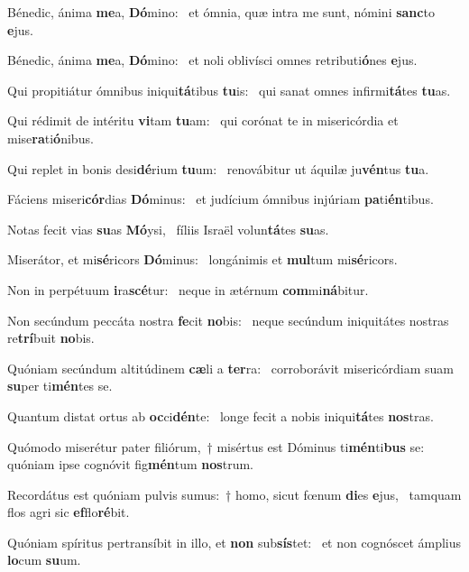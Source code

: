 \item Bénedic, ánima \textbf{me}a, \textbf{Dó}mino:~\psstar{} et ómnia, quæ intra me sunt, nómini \textbf{sanc}to \textbf{e}jus.
\item Bénedic, ánima \textbf{me}a, \textbf{Dó}mino:~\psstar{} et noli oblivísci omnes retributi\textbf{ó}nes \textbf{e}jus.
\item Qui propitiátur ómnibus iniqui\textbf{tá}tibus \textbf{tu}is:~\psstar{} qui sanat omnes infirmi\textbf{tá}tes \textbf{tu}as.
\item Qui rédimit de intéritu \textbf{vi}tam \textbf{tu}am:~\psstar{} qui corónat te in misericórdia et mise\textbf{ra}ti\textbf{ó}nibus.
\item Qui replet in bonis desi\textbf{dé}rium \textbf{tu}um:~\psstar{} renovábitur ut áquilæ ju\textbf{vén}tus \textbf{tu}a.
\item Fáciens miseri\textbf{cór}dias \textbf{Dó}minus:~\psstar{} et judícium ómnibus injúriam \textbf{pa}ti\textbf{én}tibus.
\item Notas fecit vias \textbf{su}as \textbf{Mó}ysi,~\psstar{} fíliis Israël volun\textbf{tá}tes \textbf{su}as.
\item Miserátor, et mi\textbf{sé}ricors \textbf{Dó}minus:~\psstar{} longánimis et \textbf{mul}tum mi\textbf{sé}ricors.
\item Non in perpétuum \textbf{i}ra\textbf{scé}tur:~\psstar{} neque in ætérnum \textbf{com}mi\textbf{ná}bi\-tur.
\item Non secúndum peccáta nostra \textbf{fe}cit \textbf{no}bis:~\psstar{} neque secúndum iniquitátes nostras re\textbf{trí}buit \textbf{no}bis.
\item Quóniam secúndum altitúdinem \textbf{cæ}li a \textbf{ter}ra:~\psstar{} corroborávit misericórdiam suam \textbf{su}per ti\textbf{mén}tes se.
\item Quantum distat ortus ab \textbf{oc}ci\textbf{dén}te:~\psstar{} longe fecit a nobis iniqui\textbf{tá}tes \textbf{nos}tras.
\item Quómodo miserétur pater filiórum,~† misértus est Dóminus ti\textbf{mén}ti\textbf{bus} se:~\psstar{} quóniam ipse cognóvit fig\textbf{mén}tum \textbf{nos}trum.
\item Recordátus est quóniam pulvis sumus:~† homo, sicut fœnum \textbf{di}es \textbf{e}jus,~\psstar{} tamquam flos agri sic \textbf{ef}flo\textbf{ré}bit.
\item Quóniam spíritus pertransíbit in illo, et \textbf{non} sub\textbf{sís}tet:~\psstar{} et non cognóscet ámplius \textbf{lo}cum \textbf{su}um.
